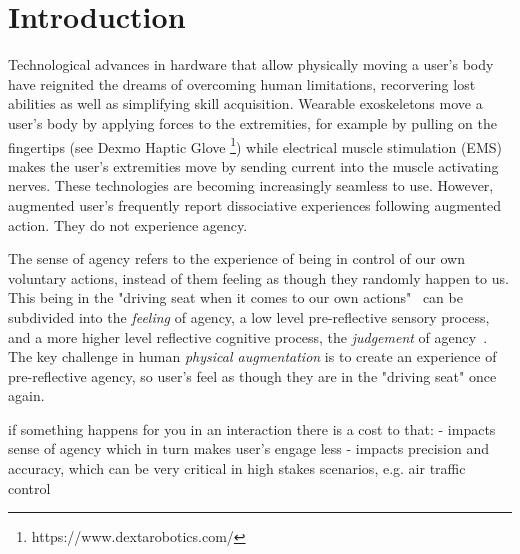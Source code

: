 \section{Introduction}


Technological advances in hardware that allow physically moving a user's body have reignited the dreams of overcoming human limitations, recorvering lost abilities as well as simplifying skill acquisition. Wearable exoskeletons move a user's body by applying forces to the extremities, for example by pulling on the fingertips (see Dexmo Haptic Glove \footnote{https://www.dextarobotics.com/}) while electrical muscle stimulation (EMS) makes the user's extremities move by sending current into the muscle activating nerves. These technologies are becoming increasingly seamless to use. However, augmented user's frequently report dissociative experiences following augmented action. They do not experience agency. 

The sense of agency refers to the experience of being in control of our own voluntary actions, instead of them feeling as though they randomly happen to us. This being in the "driving seat when it comes to our own actions"~\cite{Moore2016-ubd} can be subdivided into the \textit{feeling} of agency, a low level pre-reflective sensory process, and a more higher level reflective cognitive process, the \textit{judgement} of agency~\cite{Moore2016-ub, Danry2022-xk}. The key challenge in human \textit{physical augmentation} is to create an experience of pre-reflective agency, so user's feel as though they are in the "driving seat" once again.



if something happens for you in an interaction there is a cost to that:
- impacts sense of agency which in turn makes user's engage less
- impacts precision and accuracy, which can be very critical in high stakes scenarios, e.g. air traffic control

